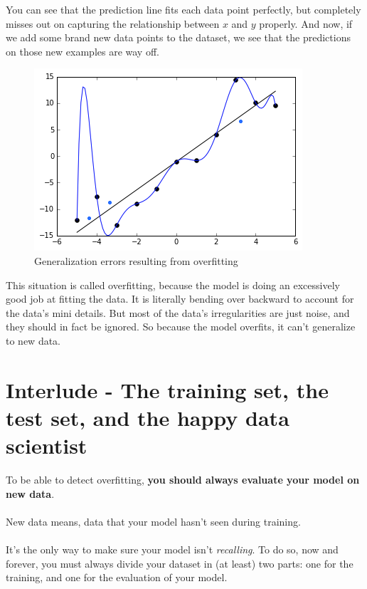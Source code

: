 You can see that the prediction line fits each data point perfectly, but completely misses out on capturing the relationship between $x$ and $y$ properly.
And now, if we add some brand new data points to the dataset, we see that the predictions on those new examples are way off.

\begin{figure}[!h]
    \centering
    \includegraphics[scale=0.6]{assets/overfitt_with_dots.png}
    \caption{Generalization errors resulting from overfitting}
\end{figure}
This situation is called overfitting, because the model is doing an excessively good job at fitting the data.
It is literally bending over backward to account for the data's mini details.
But most of the data's irregularities are just noise, and they should in fact be ignored.
So because the model overfits, it can't generalize to new data.

\section*{Interlude - The training set, the test set, and the happy data scientist}
To be able to detect overfitting, \textbf{you should always evaluate your model on new data}.\\
\\
New data means, data that your model hasn't seen during training.\\
\\
It's the only way to make sure your model isn't \textit{recalling}.
To do so, now and forever, you must always divide your dataset in (at least) two parts: one for the training, and one for the evaluation of your model.